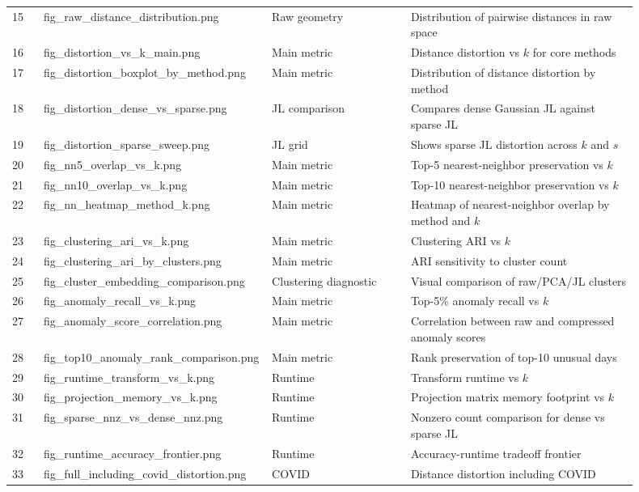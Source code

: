 \documentclass[11pt]{article}
\begin{document}
\begin{longtable}{p{0.05\linewidth} p{0.27\linewidth} p{0.22\linewidth} p{0.36\linewidth}}
15 & fig\_raw\_distance\_distribution.png & Raw geometry & Distribution of pairwise distances in raw space \\
16 & fig\_distortion\_vs\_k\_main.png & Main metric & Distance distortion vs $k$ for core methods \\
17 & fig\_distortion\_boxplot\_by\_method.png & Main metric & Distribution of distance distortion by method \\
18 & fig\_distortion\_dense\_vs\_sparse.png & JL comparison & Compares dense Gaussian JL against sparse JL \\
19 & fig\_distortion\_sparse\_sweep.png & JL grid & Shows sparse JL distortion across $k$ and $s$ \\
20 & fig\_nn5\_overlap\_vs\_k.png & Main metric & Top-5 nearest-neighbor preservation vs $k$ \\
21 & fig\_nn10\_overlap\_vs\_k.png & Main metric & Top-10 nearest-neighbor preservation vs $k$ \\
22 & fig\_nn\_heatmap\_method\_k.png & Main metric & Heatmap of nearest-neighbor overlap by method and $k$ \\
23 & fig\_clustering\_ari\_vs\_k.png & Main metric & Clustering ARI vs $k$ \\
24 & fig\_clustering\_ari\_by\_clusters.png & Main metric & ARI sensitivity to cluster count \\
25 & fig\_cluster\_embedding\_comparison.png & Clustering diagnostic & Visual comparison of raw/PCA/JL clusters \\
26 & fig\_anomaly\_recall\_vs\_k.png & Main metric & Top-5\% anomaly recall vs $k$ \\
27 & fig\_anomaly\_score\_correlation.png & Main metric & Correlation between raw and compressed anomaly scores \\
28 & fig\_top10\_anomaly\_rank\_comparison.png & Main metric & Rank preservation of top-10 unusual days \\
29 & fig\_runtime\_transform\_vs\_k.png & Runtime & Transform runtime vs $k$ \\
30 & fig\_projection\_memory\_vs\_k.png & Runtime & Projection matrix memory footprint vs $k$ \\
31 & fig\_sparse\_nnz\_vs\_dense\_nnz.png & Runtime & Nonzero count comparison for dense vs sparse JL \\
32 & fig\_runtime\_accuracy\_frontier.png & Runtime & Accuracy-runtime tradeoff frontier \\
33 & fig\_full\_including\_covid\_distortion.png & COVID & Distance distortion including COVID \\

\end{longtable}
\end{document}
